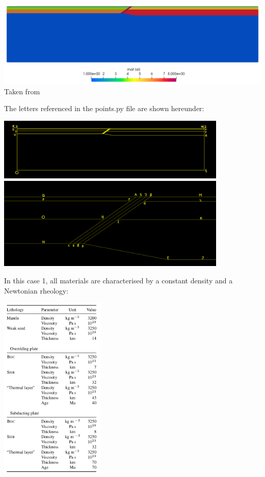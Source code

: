 \begin{center}
\includegraphics[width=\linewidth]{python_codes/fieldstone_62/results/mats1}\\
{\captionfont Taken from \cite{quin14}}
\end{center}

The letters referenced in the {points.py} file are shown hereunder:

\begin{center}
\includegraphics[width=11cm]{python_codes/fieldstone_62/images/setup1}\\
\includegraphics[width=11cm]{python_codes/fieldstone_62/images/setup2}
\end{center}


In this case 1, all materials are characterised by a constant density and a Newtonian rheology:
\begin{center}
\includegraphics[width=5cm]{python_codes/fieldstone_62/images/quin14_mats}
\end{center}

